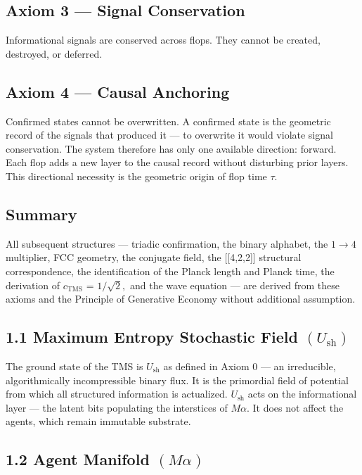 \documentclass[11pt,oneside]{report}
\theoremstyle{definition}
\theoremstyle{remark}
\begin{document}
\subsection*{Axiom 3 --- Signal Conservation}

Informational signals are conserved across flops. They cannot be
created, destroyed, or deferred.

\subsection*{Axiom 4 --- Causal Anchoring}

Confirmed states cannot be overwritten. A confirmed state is the
geometric record of the signals that produced it --- to overwrite it
would violate signal conservation. The system therefore has only one
available direction: forward. Each flop adds a new layer to the causal
record without disturbing prior layers. This directional necessity is
the geometric origin of flop time \ensuremath{\tau .}

\subsection*{Summary}

All subsequent structures --- triadic confirmation, the binary alphabet,
the \ensuremath{1\to 4} multiplier, FCC geometry, the conjugate field, the
[[4,2,2]] structural correspondence, the identification of the
Planck length and Planck time, the derivation of \ensuremath{c_{\mathrm{TMS}}} = \ensuremath{1/\sqrt{2},} and the
wave equation --- are derived from these axioms and the Principle of
Generative Economy without additional assumption.

\subsection*{1.1 Maximum Entropy Stochastic Field \ensuremath{(U_{\mathrm{sh}})}}

The ground state of the TMS is \ensuremath{U_{\mathrm{sh}}} as defined in Axiom 0 --- an
irreducible, algorithmically incompressible binary flux. It is the
primordial field of potential from which all structured information is
actualized. \ensuremath{U_{\mathrm{sh}}} acts on the informational layer --- the latent bits
populating the interstices of \ensuremath{M\alpha .} It does not affect the agents, which
remain immutable substrate.

\subsection*{1.2 Agent Manifold \ensuremath{(M\alpha )}}
\end{document}
